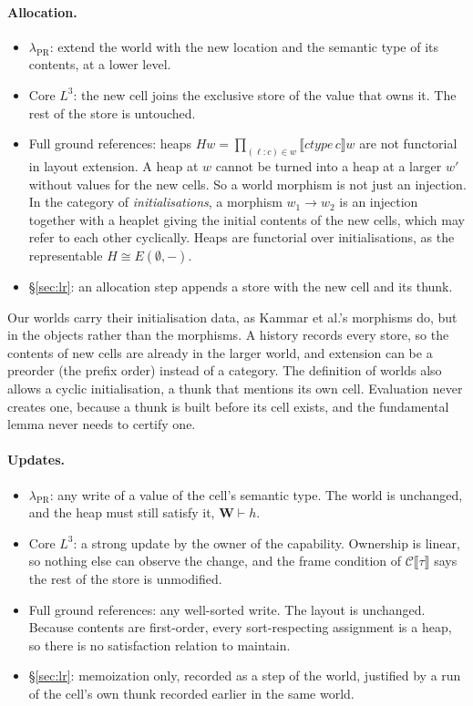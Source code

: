 \documentclass[11pt]{article}
\begin{document}
\paragraph{Allocation.}
\begin{itemize}
  \item $\lambda_{\mathrm{PR}}$: extend the world with the new location and
    the semantic type of its contents, at a lower level.
  \item Core $L^3$: the new cell joins the exclusive store of the value that
    owns it. The rest of the store is untouched.
  \item Full ground references: heaps
    $H w = \prod_{(\ell : c) \in w} \llbracket \mathit{ctype}\,c \rrbracket w$
    are not functorial in layout extension. A heap at $w$ cannot be turned
    into a heap at a larger $w'$ without values for the new cells. So a world
    morphism is not just an injection. In the category of
    \emph{initialisations}, a morphism $w_1 \to w_2$ is an injection together
    with a heaplet giving the initial contents of the new cells, which may
    refer to each other cyclically. Heaps are functorial over
    initialisations, as the representable $H \cong E(\emptyset, -)$.
  \item \S\ref{sec:lr}: an allocation step appends a store with the new cell
    and its thunk.
\end{itemize}

Our worlds carry their initialisation data, as Kammar et al.'s morphisms do,
but in the objects rather than the morphisms. A history records every store,
so the contents of new cells are already in the larger world, and extension
can be a preorder (the prefix order) instead of a category. The definition
of worlds also allows a cyclic initialisation, a thunk that mentions its own
cell. Evaluation never creates one, because a thunk is built before its cell
exists, and the fundamental lemma never needs to certify one.

\paragraph{Updates.}
\begin{itemize}
  \item $\lambda_{\mathrm{PR}}$: any write of a value of the cell's semantic
    type. The world is unchanged, and the heap must still satisfy it,
    $\mathbf{W} \vdash h$.
  \item Core $L^3$: a strong update by the owner of the capability. Ownership
    is linear, so nothing else can observe the change, and the frame
    condition of $\mathcal{C}\llbracket\tau\rrbracket$ says the rest of the
    store is unmodified.
  \item Full ground references: any well-sorted write. The layout is
    unchanged. Because contents are first-order, every sort-respecting
    assignment is a heap, so there is no satisfaction relation to maintain.
  \item \S\ref{sec:lr}: memoization only, recorded as a step of the world,
    justified by a run of the cell's own thunk recorded earlier in the same
    world.
\end{itemize}
\end{document}
